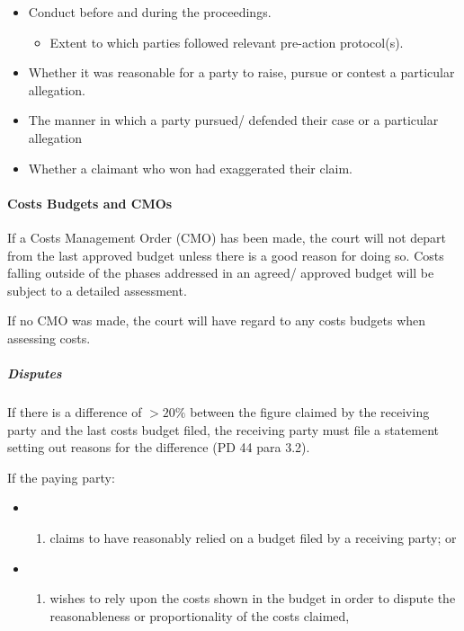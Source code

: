 \documentclass[
]{article}
\providecommand{\tightlist}{%
  \setlength{\itemsep}{0pt}\setlength{\parskip}{0pt}}
\begin{document}
\begin{itemize}
\tightlist
\item
  Conduct before and during the proceedings.

  \begin{itemize}
  \tightlist
  \item
    Extent to which parties followed relevant pre-action protocol(s).
  \end{itemize}
\item
  Whether it was reasonable for a party to raise, pursue or contest a
  particular allegation.
\item
  The manner in which a party pursued/ defended their case or a
  particular allegation
\item
  Whether a claimant who won had exaggerated their claim.
\end{itemize}

\hypertarget{costs-budgets-and-cmos}{%
\paragraph{Costs Budgets and CMOs}\label{costs-budgets-and-cmos}}

If a Costs Management Order (CMO) has been made, the court will not
depart from the last approved budget unless there is a good reason for
doing so. Costs falling outside of the phases addressed in an agreed/
approved budget will be subject to a detailed assessment.

If no CMO was made, the court will have regard to any costs budgets when
assessing costs.

\hypertarget{disputes}{%
\subparagraph{Disputes}\label{disputes}}

If there is a difference of \(>20\%\) between the figure claimed by the
receiving party and the last costs budget filed, the receiving party
must file a statement setting out reasons for the difference (PD 44 para
3.2).

If the paying party:

\begin{itemize}
\item
  \begin{enumerate}
  \def\labelenumi{(\alph{enumi})}
  \tightlist
  \item
    claims to have reasonably relied on a budget filed by a receiving
    party; or
  \end{enumerate}
\item
  \begin{enumerate}
  \def\labelenumi{(\alph{enumi})}
  \setcounter{enumi}{1}
  \tightlist
  \item
    wishes to rely upon the costs shown in the budget in order to
    dispute the reasonableness or proportionality of the costs claimed,
  \end{enumerate}
\end{itemize}
\end{document}
